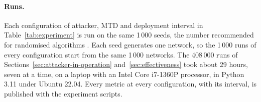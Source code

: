 \documentclass{cshonours}
\begin{document}
\paragraph{Runs.} Each configuration of attacker, MTD and deployment interval
in Table~\ref{tab:experiment} is run on the same 1\,000 seeds, the number
recommended for randomised algorithms \citep{arcuri2014hitchhiker}. Each
seed generates one network, so the 1\,000 runs of every configuration start
from the same 1\,000 networks.
The 408\,000 runs of Sections~\ref{sec:attacker-in-operation}
and~\ref{sec:effectiveness} took about 29 hours, seven at a time, on a laptop
with an Intel Core i7-1360P processor, in Python 3.11 under Ubuntu 22.04.
Every metric at every configuration, with its
interval, is published with the experiment scripts.
\end{document}
